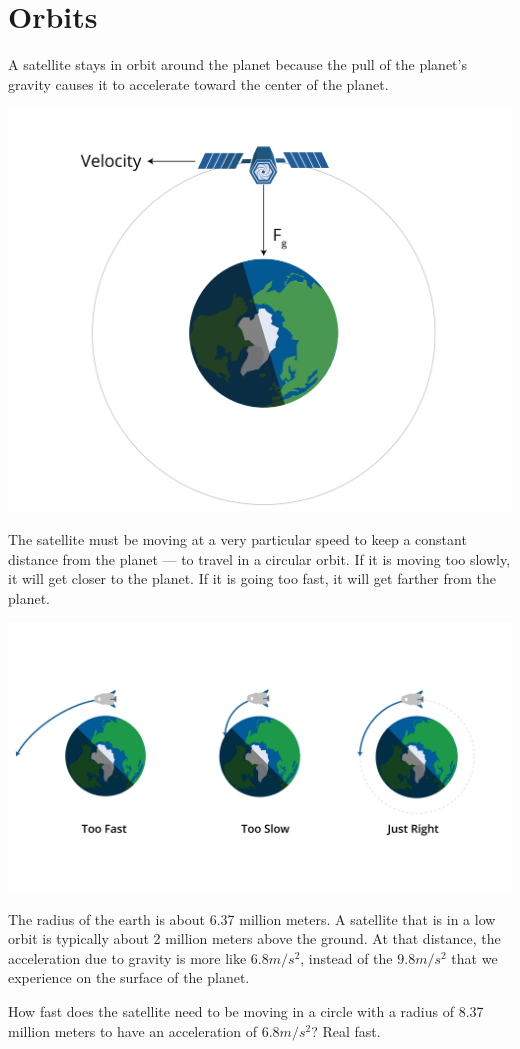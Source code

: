 \chapter{Orbits}

A satellite stays in orbit around the planet because the pull of the
planet's gravity causes it to accelerate toward the center of the
planet. 

\includegraphics[width=.75\textwidth]{satellite.png}


The satellite must be moving at a very particular speed to keep a
constant distance from the planet --- to travel in a circular orbit.
If it is moving too slowly, it will get closer to the planet.  If it
is going too fast, it will get farther from the planet.

\includegraphics[width=.75\textwidth]{orbitSpeeds.png}



The radius of the earth is about 6.37 million meters. A satellite that
is in a low orbit is typically about 2 million meters above the
ground. At that distance, the acceleration due to gravity is more like
$6.8 m/s^2$, instead of the $9.8 m/s^2$ that we experience on the
surface of the planet.

How fast does the satellite need to be moving in a circle with a
radius of 8.37 million meters to have an acceleration of $6.8 m/s^2$? Real fast.

